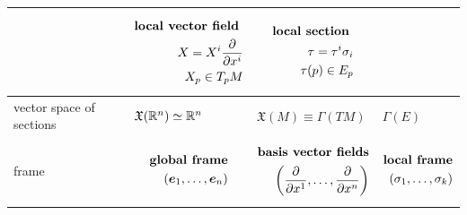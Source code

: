 \documentclass[11pt]{article}
\begin{document}
\begin{itemize}
\begin{table}[h!]
\begin{tabularx}{1\textwidth} { 
  | >{\raggedright\arraybackslash} m{2cm}
  | >{\centering\arraybackslash}X
  | >{\centering\arraybackslash}X
  | >{\centering\arraybackslash}X  | }
\begin{align*}
\end{align*} &  
\begin{align*}
\text{\textbf{local vector field} }\\
X = X^{i}\frac{\partial }{ \partial x^{i}}\\
X_{p} \in T_{p}M
\end{align*}
& \begin{align*}
\text{\textbf{local section} }\\
\tau = \tau^{i}\sigma_{i}\\
\tau(p) \in E_{p}
\end{align*} \\
\hline
vector space of sections & $\mathfrak{X}({\mathbb R}^{n}) \simeq {\mathbb R}^{n}$ & $\mathfrak{X}(M) \equiv \Gamma(TM)$ & $\Gamma(E)$ \\
\hline
frame &
\begin{align*}
\text{\textbf{global frame}}\\
\left(\boldsymbol{e}_1, \ldots, \boldsymbol{e}_{n}\right)
\end{align*} 
&
\begin{align*}
\text{\textbf{basis vector fields}}\\
\left(\frac{\partial }{ \partial x^{1}}, \ldots, \frac{\partial }{ \partial x^{n}}\right)
\end{align*} &
\begin{align*}
\text{\textbf{local frame}}\\
\left(\sigma_1, \ldots, \sigma_{k}\right)
\end{align*} \\
\hline
\end{tabularx}
\end{table}
\end{itemize}



\newpage


\end{document}
